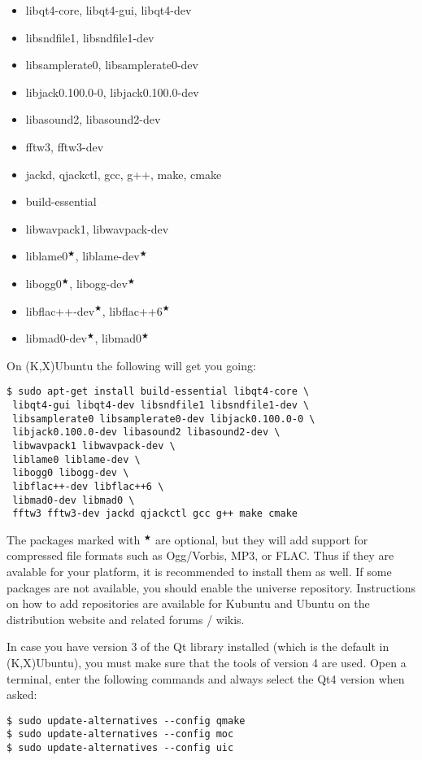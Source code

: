 \begin{itemize}
 \item libqt4-core, libqt4-gui, libqt4-dev
 \item libsndfile1, libsndfile1-dev
 \item libsamplerate0, libsamplerate0-dev
 \item libjack0.100.0-0, libjack0.100.0-dev
 \item libasound2, libasound2-dev
 \item fftw3, fftw3-dev
 \item jackd, qjackctl, gcc, g++, make, cmake
 \item build-essential
 \item libwavpack1, libwavpack-dev
 \item liblame0$^\bigstar$, liblame-dev$^\bigstar$
 \item libogg0$^\bigstar$, libogg-dev$^\bigstar$
 \item libflac++-dev$^\bigstar$, libflac++6$^\bigstar$
 \item libmad0-dev$^\bigstar$, libmad0$^\bigstar$
\end{itemize}
On (K,X)Ubuntu the following will get you going:
\begin{verbatim}
$ sudo apt-get install build-essential libqt4-core \
 libqt4-gui libqt4-dev libsndfile1 libsndfile1-dev \
 libsamplerate0 libsamplerate0-dev libjack0.100.0-0 \
 libjack0.100.0-dev libasound2 libasound2-dev \
 libwavpack1 libwavpack-dev \
 liblame0 liblame-dev \
 libogg0 libogg-dev \
 libflac++-dev libflac++6 \
 libmad0-dev libmad0 \
 fftw3 fftw3-dev jackd qjackctl gcc g++ make cmake
\end{verbatim}
The packages marked with $^\bigstar$ are optional, but they will add support for compressed file formats such as Ogg/Vorbis, MP3, or FLAC. Thus if they are avalable for your platform, it is recommended to install them as well. If some packages are not available, you should enable the universe repository. Instructions on how to add repositories are available for Kubuntu and Ubuntu on the distribution website and related forums / wikis.

In case you have version 3 of the Qt library installed (which is the default in (K,X)Ubuntu), you must make sure that the tools of version 4 are used. Open a terminal, enter the following commands and always select the Qt4 version when asked:

\begin{verbatim}
$ sudo update-alternatives --config qmake
$ sudo update-alternatives --config moc
$ sudo update-alternatives --config uic
\end{verbatim}

